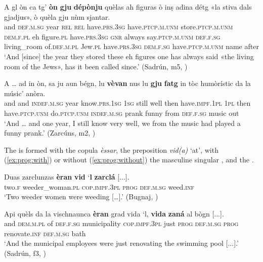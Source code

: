 \ea
\label{ex:dcomp:2}
\gll A gl òn ca tg’ \textbf{òn} \textbf{gju} \textbf{dépònju} quèlas ah figuras ò inṣ adina détg «la stiva dals gjadjus», ò quèla gju nùm sjantar.\\
and \textsc{def.m.sg} year \textsc{rel} \textsc{rel} have.\textsc{prs.3sg} have.\textsc{ptcp.m.unm} store.\textsc{ptcp.m.unm} \textsc{dem.f.pl} eh figure.\textsc{pl} have.\textsc{prs.3sg} \textsc{gnr} always say.\textsc{ptcp.m.unm} \textsc{def.f.sg} living\_room of.\textsc{def.m.pl} Jew.\textsc{pl} have.\textsc{prs.3sg} \textsc{dem.f.sg} have.\textsc{ptcp.m.unm} name after\\
\glt `And [since] the year they stored these eh figures one has always said «the living room of the Jews», has it been called since.' (Sadrún, m5, )
\z

\ea
\label{ex:dcomp:4}
\gll    A … ad in òn, sa ju aun bégn, lu \textbf{vèvan} nus lu \textbf{gju} \textbf{fatg} in tòc humòrístic  da la músic’ anòra.\\
and {} and  \textsc{indef.m.sg} year know.\textsc{prs.1sg} \textsc{1sg} still well then have.\textsc{impf.1pl} \textsc{1pl} then have.\textsc{ptcp.unm} do.\textsc{ptcp.unm} \textsc{indef.m.sg} prank funny from \textsc{def.f.sg} music out\\
\glt `And … and one year, I still know very well, we from the music had played a funny prank.' (Zarcúns, m2, )
\z

\label{sec:4.1.2.2.7}
The  is formed with the copula \textit{èssar}, the preposition \textit{vid(a)} ‘at’, with (\ref{ex:prog:with}) or without (\ref{ex:prog:without}) the masculine singular , and the .

\ea\label{ex:prog:with}
\gll    Duas zarclunzas \textbf{èran} \textbf{vid} `\textbf{l} \textbf{zarclá} [...].\\
     two.\textsc{f} weeder\_woman.\textsc{pl} \textsc{cop.impf.3pl} \textsc{prog} \textsc{def.m.sg} weed.\textsc{inf}\\
\glt `Two weeder women were weeding […].' (Bugnaj, \citealt[132]{Büchli1966})
\z

\ea\label{ex:prog:without}
\gll  Api quèls da la vischnaunca \textbf{èran} grad vida `l, \textbf{vida} \textbf{zaná} al bògn [...].  \\
and \textsc{dem.m.pl} of \textsc{def.f.sg} municipality \textsc{cop.impf.3pl} just \textsc{prog} \textsc{def.m.sg} \textsc{prog} renovate.\textsc{inf} \textsc{def.m.sg} bath\\
\glt `And the municipal employees were just renovating the swimming pool [...].' (Sadrún, f3, )
\z

